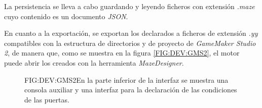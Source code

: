 La persistencia se lleva a cabo guardando y leyendo ficheros con extensión \textit{.maze} cuyo contenido es un documento \textit{JSON}.

En cuanto a la exportación, se exportan los  declarados a ficheros de extensión \textit{.yy} compatibles con la estructura de directorios y de proyecto de \textit{GameMaker Studio 2}, de manera que, como se muestra en la figura \ref{FIG:DEV:GMS2}, el motor puede abrir los  creados con la herramienta \textit{MazeDesigner}.

\begin{figure}{FIG:DEV:GMS2}{En la parte inferior de la interfaz se muestra una consola auxiliar y una interfaz para la declaración de las condiciones de las puertas.}
	 \quad
\end{figure}

